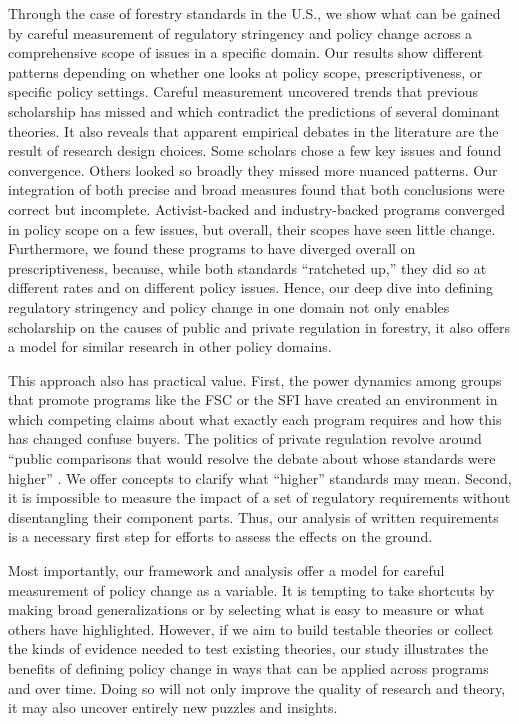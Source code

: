 \documentclass[
      12pt,
            Review ]{article}
\begin{document}
Through the case of forestry standards in the U.S., we show what can be
gained by careful measurement of regulatory stringency and policy change
across a comprehensive scope of issues in a specific domain. Our results
show different patterns depending on whether one looks at policy scope,
prescriptiveness, or specific policy settings. Careful measurement
uncovered trends that previous scholarship has missed and which
contradict the predictions of several dominant theories. It also reveals
that apparent empirical debates in the literature are the result of
research design choices. Some scholars chose a few key issues and found
convergence. Others looked so broadly they missed more nuanced patterns.
Our integration of both precise and broad measures found that both
conclusions were correct but incomplete. Activist-backed and
industry-backed programs converged in policy scope on a few issues, but
overall, their scopes have seen little change. Furthermore, we found
these programs to have diverged overall on prescriptiveness, because,
while both standards ``ratcheted up,'' they did so at different rates
and on different policy issues. Hence, our deep dive into defining
regulatory stringency and policy change in one domain not only enables
scholarship on the causes of public and private regulation in forestry,
it also offers a model for similar research in other policy domains.

This approach also has practical value. First, the power dynamics among
groups that promote programs like the FSC or the SFI have created an
environment in which competing claims about what exactly each program
requires and how this has changed confuse buyers. The politics of
private regulation revolve around ``public comparisons that would
resolve the debate about whose standards were higher''
\citep{Overdevest2010}. We offer concepts to clarify what ``higher''
standards may mean. Second, it is impossible to measure the impact of a
set of regulatory requirements without disentangling their component
parts. Thus, our analysis of written requirements is a necessary first
step for efforts to assess the effects on the ground.

Most importantly, our framework and analysis offer a model for careful
measurement of policy change as a variable. It is tempting to take
shortcuts by making broad generalizations or by selecting what is easy
to measure or what others have highlighted. However, if we aim to build
testable theories or collect the kinds of evidence needed to test
existing theories, our study illustrates the benefits of defining policy
change in ways that can be applied across programs and over time. Doing
so will not only improve the quality of research and theory, it may also
uncover entirely new puzzles and insights.
  \newpage 
  \theendnotes
\newpage
\singlespacing 
           
  
\end{document}
